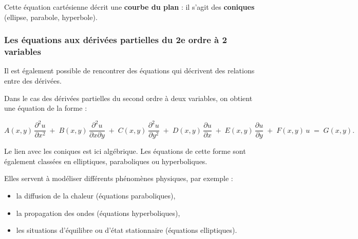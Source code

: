 Cette équation cartésienne décrit une \textbf{courbe du plan} : il s’agit des \textbf{coniques} (ellipse, parabole, hyperbole).

\subsubsection{Les équations aux dérivées partielles du 2e ordre à 2 variables}
Il est également possible de rencontrer des équations qui décrivent des relations entre des dérivées.

Dans le cas des dérivées partielles du second ordre à deux variables, on obtient une équation de la forme :

\[
A(x,y)\, \dfrac{\partial^2 u}{\partial x^2}
\;+\;
B(x,y)\, \dfrac{\partial^2 u}{\partial x \partial y}
\;+\;
C(x,y)\, \dfrac{\partial^2 u}{\partial y^2}
\;+\;
D(x,y)\, \dfrac{\partial u}{\partial x}
\;+\;
E(x,y)\, \dfrac{\partial u}{\partial y}
\;+\;
F(x,y)\, u
\;=\;
G(x,y).
\]

Le lien avec les coniques est ici algébrique.  
Les équations de cette forme sont également classées en elliptiques, paraboliques ou hyperboliques.

Elles servent à modéliser différents phénomènes physiques, par exemple :
\begin{itemize}
    \item la diffusion de la chaleur (équations paraboliques),
    \item la propagation des ondes (équations hyperboliques),
    \item les situations d’équilibre ou d’état stationnaire (équations elliptiques).
\end{itemize}



